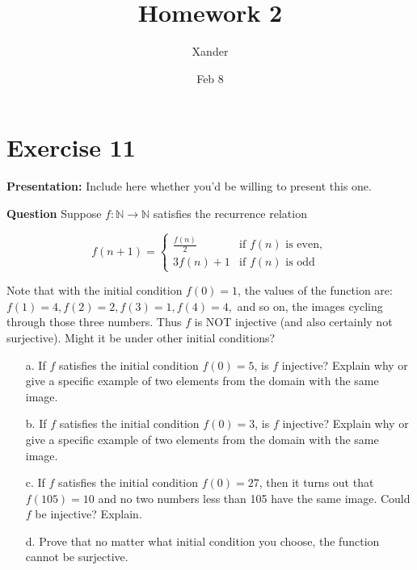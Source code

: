\documentclass{article}
\title{Homework 2}
\author{Xander}
\date{Feb 8}
\begin{document}
\maketitle



\section*{Exercise 11}  

\noindent\textbf{Presentation:} Include here whether you'd be willing to present this one. 

\vspace{0.5cm} %

\noindent\textbf{Question}
Suppose \( f : \mathbb{N} \rightarrow \mathbb{N} \) satisfies the recurrence relation

\[
f(n + 1) = \begin{cases} 
\frac{f(n)}{2} & \text{if } f(n) \text{ is even}, \\
3f(n) + 1 & \text{if } f(n) \text{ is odd}
\end{cases}
\]

Note that with the initial condition \( f(0) = 1 \), the values of the function are:
\( f(1) = 4, f(2) = 2, f(3) = 1, f(4) = 4, \) and so on, the images cycling through
those three numbers. Thus \( f \) is NOT injective (and also certainly not surjective).
Might it be under other initial conditions?

\begin{enumerate}
    \item[a.] If \( f \) satisfies the initial condition \( f(0) = 5 \), is \( f \) injective? Explain why or give a specific example of two elements from the domain with the same image.

    \item[b.] If \( f \) satisfies the initial condition \( f(0) = 3 \), is \( f \) injective? Explain why or give a specific example of two elements from the domain with the same image.

    \item[c.] If \( f \) satisfies the initial condition \( f(0) = 27 \), then it turns out that \( f(105) = 10 \) and no two numbers less than 105 have the same image. Could \( f \) be injective? Explain.

    \item[d.] Prove that no matter what initial condition you choose, the function cannot be surjective.
\end{enumerate}
\end{document}
